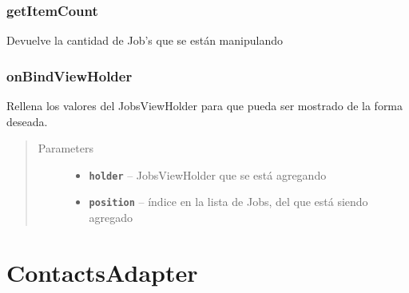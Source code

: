 \documentclass[letterpaper,10pt,english]{sphinxmanual}
\begin{document}
\subsubsection{getItemCount}
\label{Adapter/JobsAdapter:getitemcount}

\begin{fulllineitems}
\label{Adapter/JobsAdapter:com.fiuba.tallerii.jobify.JobsAdapter.getItemCount()}
Devuelve la cantidad de Job's que se están manipulando

\end{fulllineitems}



\subsubsection{onBindViewHolder}
\label{Adapter/JobsAdapter:onbindviewholder}

\begin{fulllineitems}
\label{Adapter/JobsAdapter:com.fiuba.tallerii.jobify.JobsAdapter.onBindViewHolder(JobsViewHolder, int)}
Rellena los valores del JobsViewHolder para que pueda ser mostrado de la forma deseada.
\begin{quote}\begin{description}
\item[{Parameters}] \leavevmode\begin{itemize}
\item {} 
\textbf{\texttt{holder}} -- JobsViewHolder que se está agregando

\item {} 
\textbf{\texttt{position}} -- índice en la lista de Jobs, del  que está siendo agregado

\end{itemize}

\end{description}\end{quote}

\end{fulllineitems}



\section{ContactsAdapter}
\label{Adapter/ContactsAdapter:contactsadapter}\label{Adapter/ContactsAdapter::doc}
\end{document}
